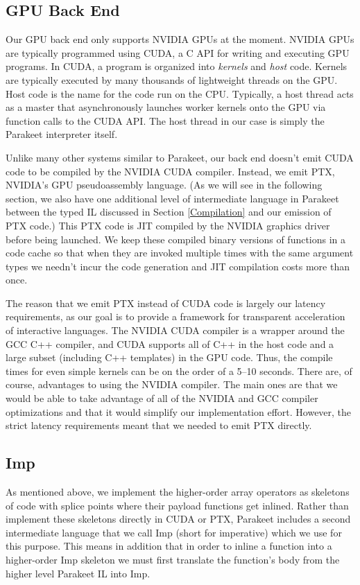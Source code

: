 \documentclass[preprint]{sigplanconf}
\begin{document}
\subsection{GPU Back End}
Our GPU back end only supports NVIDIA GPUs at the moment. NVIDIA GPUs are typically programmed using CUDA, a C API for writing and executing GPU programs. In CUDA, a program is organized into {\it kernels} and {\it host} code. Kernels are typically executed by many thousands of lightweight threads on the GPU.  Host code is the name for the code run on the CPU. Typically, a host thread acts as a master that asynchronously launches worker kernels onto the GPU via function calls to the CUDA API.  The host thread in our case is simply the Parakeet interpreter itself.

Unlike many other systems similar to Parakeet, our back end doesn't emit CUDA code to be compiled by the NVIDIA CUDA compiler.  Instead, we emit PTX, NVIDIA's GPU pseudoassembly language.  (As we will see in the following section, we also have one additional level of intermediate language in Parakeet between the typed IL discussed in Section \ref{Compilation} and our emission of PTX code.)  This PTX code is JIT compiled by the NVIDIA graphics driver before being launched.  We keep these compiled binary versions of functions in a code cache so that when they are invoked multiple times with the same argument types we needn't incur the code generation and JIT compilation costs more than once.

The reason that we emit PTX instead of CUDA code is largely our latency requirements, as our goal is to provide a framework for transparent acceleration of interactive languages. The NVIDIA CUDA compiler is a wrapper around the GCC C++ compiler, and CUDA supports all of C++ in the host code and a large subset (including C++ templates) in the GPU code.  Thus, the compile times for even simple kernels can be on the order of a 5--10 seconds.  There are, of course, advantages to using the NVIDIA compiler. The main ones are that we would be able to take advantage of all of the NVIDIA and GCC compiler optimizations and that it would simplify our implementation effort.  However, the strict latency requirements meant that we needed to emit PTX directly.

\subsection{Imp}
\label{Imp}

As mentioned above, we implement the higher-order array operators as skeletons of code with splice points where their payload functions get inlined.  Rather than implement these skeletons directly in CUDA or PTX, Parakeet includes a second intermediate language that we call Imp (short for imperative) which we use for this purpose.  This means in addition that in order to inline a function into a higher-order Imp skeleton we must first translate the function's body from the higher level Parakeet IL into Imp.
\end{document}
